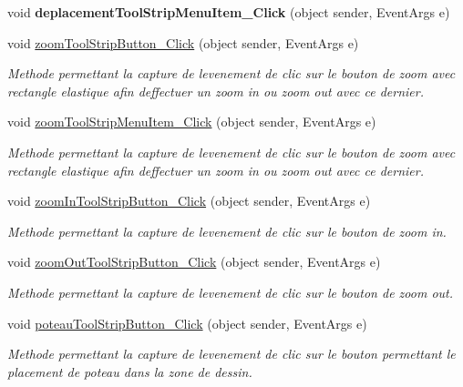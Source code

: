 \begin{DoxyCompactItemize}
void {\bfseries deplacement\+Tool\+Strip\+Menu\+Item\+\_\+\+Click} (object sender, Event\+Args e)
\item 
void \hyperlink{group__inf2990_ga124d0509624e75bd31e0d5ab27d1aae5}{zoom\+Tool\+Strip\+Button\+\_\+\+Click} (object sender, Event\+Args e)
\begin{DoxyCompactList}\small\item\em Methode permettant la capture de l\textquotesingle{}evenement de clic sur le bouton de zoom avec rectangle elastique afin d\textquotesingle{}effectuer un zoom in ou zoom out avec ce dernier. \end{DoxyCompactList}\item 
void \hyperlink{group__inf2990_ga775c1d6f6fa75521851d7ecd97c6d39b}{zoom\+Tool\+Strip\+Menu\+Item\+\_\+\+Click} (object sender, Event\+Args e)
\begin{DoxyCompactList}\small\item\em Methode permettant la capture de l\textquotesingle{}evenement de clic sur le bouton de zoom avec rectangle elastique afin d\textquotesingle{}effectuer un zoom in ou zoom out avec ce dernier. \end{DoxyCompactList}\item 
void \hyperlink{group__inf2990_ga8b125799e50f3f79b91b5d9c066e935f}{zoom\+In\+Tool\+Strip\+Button\+\_\+\+Click} (object sender, Event\+Args e)
\begin{DoxyCompactList}\small\item\em Methode permettant la capture de l\textquotesingle{}evenement de clic sur le bouton de zoom in. \end{DoxyCompactList}\item 
void \hyperlink{group__inf2990_ga12977b1ecb58e8aeb8928ca6727acb84}{zoom\+Out\+Tool\+Strip\+Button\+\_\+\+Click} (object sender, Event\+Args e)
\begin{DoxyCompactList}\small\item\em Methode permettant la capture de l\textquotesingle{}evenement de clic sur le bouton de zoom out. \end{DoxyCompactList}\item 
void \hyperlink{group__inf2990_gaa483758f8baaa72c1fdc33f544911e6e}{poteau\+Tool\+Strip\+Button\+\_\+\+Click} (object sender, Event\+Args e)
\begin{DoxyCompactList}\small\item\em Methode permettant la capture de l\textquotesingle{}evenement de clic sur le bouton permettant le placement de poteau dans la zone de dessin. \end{DoxyCompactList}\item 

\end{DoxyCompactItemize}
